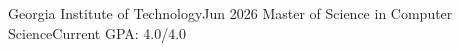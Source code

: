 \resumeSubheading
  {Georgia Institute of Technology}{Jun 2026}
  {Master of Science in Computer Science}{Current GPA: 4.0/4.0}
